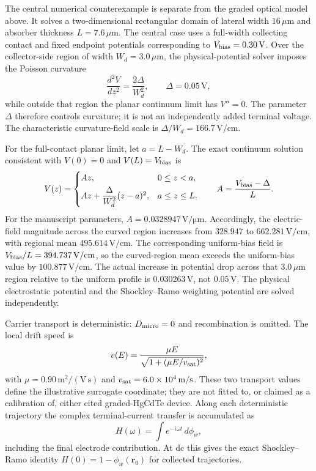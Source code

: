 \documentclass[aps,pra,onecolumn,superscriptaddress,nofootinbib]{revtex4-2}
\begin{document}
The central numerical counterexample is separate from the graded optical model above.  It solves a two-dimensional rectangular domain of lateral width $16\,\mu\mathrm{m}$ and absorber thickness $L=7.6\,\mu\mathrm{m}$.  The central case uses a full-width collecting contact and fixed endpoint potentials corresponding to $V_{\rm bias}=0.30\,\mathrm{V}$.  Over the collector-side region of width $W_d=3.0\,\mu\mathrm{m}$, the physical-potential solver imposes the Poisson curvature
\begin{equation}
\frac{d^2V}{dz^2}=\frac{2\Delta}{W_d^2},
\qquad \Delta=0.05\,\mathrm{V},
\end{equation}
while outside that region the planar continuum limit has $V''=0$.  The parameter $\Delta$ therefore controls curvature; it is not an independently added terminal voltage.  The characteristic curvature-field scale is $\Delta/W_d=166.7\,\mathrm{V/cm}$.

For the full-contact planar limit, let $a=L-W_d$.  The exact continuum solution consistent with $V(0)=0$ and $V(L)=V_{\rm bias}$ is
\begin{equation}
V(z)=
\begin{cases}
Az, & 0\le z<a,\\[3pt]
Az+\dfrac{\Delta}{W_d^2}(z-a)^2, & a\le z\le L,
\end{cases}
\qquad
A=\frac{V_{\rm bias}-\Delta}{L}.
\label{eq:planar-poisson}
\end{equation}
For the manuscript parameters, $A=0.0328947\,\mathrm{V/\mu m}$.  Accordingly, the electric-field magnitude across the curved region increases from $328.947$ to $662.281\,\mathrm{V/cm}$, with regional mean $495.614\,\mathrm{V/cm}$.  The corresponding uniform-bias field is $V_{\rm bias}/L=394.737\,\mathrm{V/cm}$, so the curved-region mean exceeds the uniform-bias value by $100.877\,\mathrm{V/cm}$.  The actual increase in potential drop across that $3.0\,\mu\mathrm{m}$ region relative to the uniform profile is $0.030263\,\mathrm{V}$, not $0.05\,\mathrm{V}$.  The physical electrostatic potential and the Shockley--Ramo weighting potential are solved independently.

Carrier transport is deterministic: $D_{\rm micro}=0$ and recombination is omitted.  The local drift speed is
\begin{equation}
v(E)=\frac{\mu E}{\sqrt{1+(\mu E/v_{\rm sat})^2}},
\end{equation}
with $\mu=0.90\,\mathrm{m^2/(V\,s)}$ and $v_{\rm sat}=6.0\times10^4\,\mathrm{m/s}$.  These two transport values define the illustrative surrogate coordinate; they are not fitted to, or claimed as a calibration of, either cited graded-HgCdTe device.  Along each deterministic trajectory the complex terminal-current transfer is accumulated as
\begin{equation}
H(\omega)=\int e^{-i\omega t}\,d\phi_w,
\end{equation}
including the final electrode contribution.  At dc this gives the exact Shockley--Ramo identity $H(0)=1-\phi_w(\mathbf r_0)$ for collected trajectories.
\end{document}
